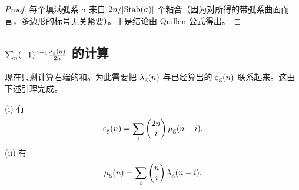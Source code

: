 \begin{proof}
每个填满弧系 $\sigma$ 来自 $2n/|{\rm Stab(\sigma)}|$ 个粘合（因为对所得的带弧系曲面而言，多边形的标号无关紧要）。于是结论由 Quillen 公式得出。
\end{proof}

\subsection{$\sum_n (-1)^{n-1}\frac{\lambda_{\rm g}(n)}{2n}$ 的计算}

现在只剩计算右端的和。为此需要把 $\lambda_{\rm g}(n)$ 与已经算出的 $\varepsilon_{\rm g}(n)$ 联系起来。这由下述引理完成。

\begin{lemma}\label{rel}
(i) 有
$$
\varepsilon_{\rm g}(n)=\sum_i \begin{pmatrix}2n\\ i\end{pmatrix}
\mu_{\rm g}(n-i).
$$
(ii) 有
$$
\mu_{\rm g}(n)=\sum_i \begin{pmatrix}n\\ i\end{pmatrix}
\lambda_{\rm g}(n-i).
$$
\end{lemma}

